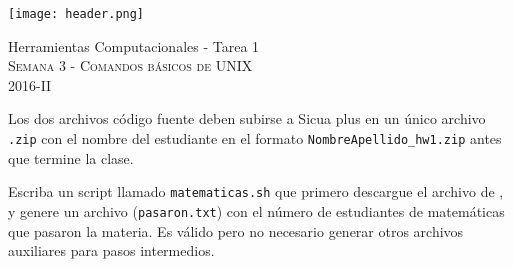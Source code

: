 \documentclass[11pt,letterpaper]{exam}
\begin{document}
\begin{center}

\texttt{[image: header.png]}

\vspace{1.0cm}
{\Large Herramientas Computacionales - Tarea 1} \\
\textsc{Semana 3 - Comandos b\'asicos de UNIX}\\
2016-II\\
\end{center}



\vspace{0.5cm}

\noindent
Los dos archivos c\'odigo fuente deben subirse a Sicua plus en un \'unico archivo
\verb".zip" con el nombre del estudiante en el formato \verb"NombreApellido_hw1.zip" antes que termine la clase.

\vspace{0.5cm}

\begin{questions}
 

Escriba un script llamado \verb"matematicas.sh" que primero descargue el archivo de ,
y genere un archivo (\verb"pasaron.txt") con el número de estudiantes de matemáticas que pasaron la materia.
Es válido pero no necesario generar otros archivos auxiliares para pasos intermedios.


\end{questions}
\end{document}
